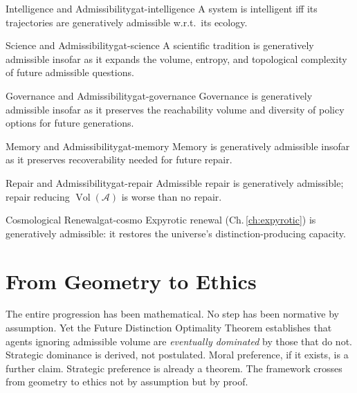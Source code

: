\documentclass[12pt,twoside,openright]{book}
\newcommand{\adm}{\mathcal{A}}
\newcommand{\Vol}{\operatorname{Vol}}
\begin{document}
\begin{corollary}{Intelligence and Admissibility}{gat-intelligence}
  A system is intelligent iff its trajectories are
  generatively admissible w.r.t.\ its ecology.
\end{corollary}
\begin{corollary}{Science and Admissibility}{gat-science}
  A scientific tradition is generatively admissible insofar
  as it expands the volume, entropy, and topological
  complexity of future admissible questions.
\end{corollary}
\begin{corollary}{Governance and Admissibility}{gat-governance}
  Governance is generatively admissible insofar as it
  preserves the reachability volume and diversity of
  policy options for future generations.
\end{corollary}
\begin{corollary}{Memory and Admissibility}{gat-memory}
  Memory is generatively admissible insofar as it
  preserves recoverability needed for future repair.
\end{corollary}
\begin{corollary}{Repair and Admissibility}{gat-repair}
  Admissible repair is generatively admissible;
  repair reducing $\Vol(\adm)$ is worse than no repair.
\end{corollary}
\begin{corollary}{Cosmological Renewal}{gat-cosmo}
  Expyrotic renewal (Ch.\,\ref{ch:expyrotic}) is
  generatively admissible: it restores the universe's
  distinction-producing capacity.
\end{corollary}

\section{From Geometry to Ethics}

The entire progression has been mathematical. No step has
been normative by assumption. Yet the Future Distinction
Optimality Theorem establishes that agents ignoring
admissible volume are \emph{eventually dominated} by those
that do not. Strategic dominance is derived, not postulated.
Moral preference, if it exists, is a further claim.
Strategic preference is already a theorem. The framework
crosses from geometry to ethics not by assumption but
by proof.
\end{document}
